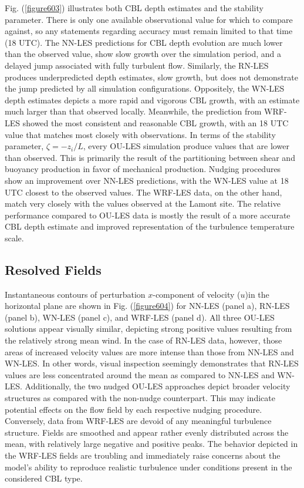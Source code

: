 Fig. (\autoref{figure603}) illustrates both CBL depth estimates and the stability parameter. There is only one available observational value for which to compare against, so any statements regarding accuracy must remain limited to that time (18 UTC). The NN-LES predictions for CBL depth evolution are much lower than the observed value, show slow growth over the simulation period, and a delayed jump associated with fully turbulent flow. Similarly, the RN-LES produces underpredicted depth estimates, slow growth, but does not demonstrate the jump predicted by all simulation configurations. Oppositely, the WN-LES depth estimates depicts a more rapid and vigorous CBL growth, with an estimate much larger than that observed locally. Meanwhile, the prediction from WRF-LES showed the most consistent and reasonable CBL growth, with an 18 UTC value that matches most closely with observations. In terms of the stability parameter, $\zeta = -z_i / L$, every OU-LES simulation produce values that are lower than observed. This is primarily the result of the partitioning between shear and buoyancy production in favor of mechanical production. Nudging procedures show an improvement over NN-LES predictions, with the WN-LES value at 18 UTC closest to the observed values. The WRF-LES data, on the other hand, match very closely with the values observed at the Lamont site. The relative performance compared to OU-LES data is mostly the result of a more accurate CBL depth estimate and improved representation of the turbulence temperature scale. 

\subsection{Resolved Fields}
\label{resolve-622}

Instantaneous contours of perturbation $x$-component of velocity ($u$)in the horizontal plane are shown in Fig. (\autoref{figure604}) for NN-LES (panel a), RN-LES (panel b), WN-LES (panel c), and WRF-LES (panel d). All three OU-LES solutions appear visually similar, depicting strong positive values resulting from the relatively strong mean wind. In the case of RN-LES data, however, those areas of increased velocity values are more intense than those from NN-LES and WN-LES. In other words, visual inspection seemingly demonstrates that RN-LES values are less concentrated around the mean as compared to NN-LES and WN-LES. Additionally, the two nudged OU-LES approaches depict broader velocity structures as compared with the non-nudge counterpart. This may indicate potential effects on the flow field by each respective nudging procedure. Conversely, data from WRF-LES are devoid of any meaningful turbulence structure. Fields are smoothed and appear rather evenly distributed across the mean, with relatively large negative and positive peaks. The behavior depicted in the WRF-LES fields are troubling and immediately raise concerns about the model's ability to reproduce realistic turbulence under conditions present in the considered CBL type.



